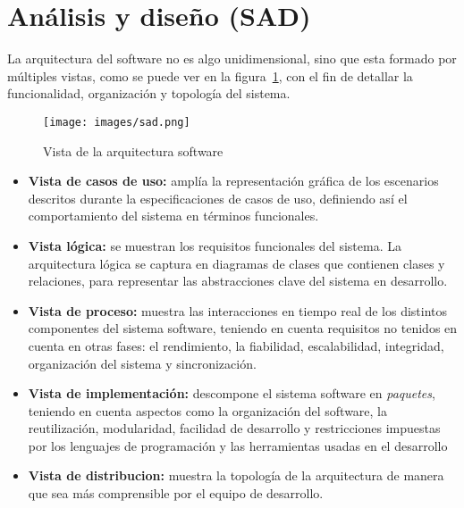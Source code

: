 
\section{Análisis y diseño (SAD)}

La arquitectura del software no es algo unidimensional, sino que esta formado 
por múltiples vistas, como se puede ver en la figura~\ref{fig:sad}, con el 
fin de detallar la funcionalidad, organización y topología del sistema.

\begin{figure}[hp]
	\centering
	\texttt{[image: images/sad.png]}
	\caption{Vista de la arquitectura software}
	\label{fig:sad}
\end{figure}

\begin{itemize}
  \item \textbf{Vista de casos de uso:} amplía la representación gráfica 
	de los escenarios descritos durante la especificaciones de casos 
	de uso, definiendo así el comportamiento del sistema en términos 
	funcionales.
  \item \textbf{Vista lógica:} se muestran los requisitos funcionales 
	del sistema. La arquitectura lógica se captura en diagramas de clases 
	que contienen clases y relaciones, para representar las abstracciones 
	clave del sistema en desarrollo.
  \item \textbf{Vista de proceso:} muestra las interacciones en tiempo real de
	los distintos componentes del sistema software, teniendo en cuenta
	requisitos no tenidos en cuenta en otras fases: el rendimiento, la 
	fiabilidad, escalabilidad, integridad, organización del sistema y 
	sincronización. 
  \item \textbf{Vista de implementación:} descompone el sistema software en
	\emph{paquetes}, teniendo en cuenta aspectos como la organización del 
	software, la reutilización, modularidad, facilidad de desarrollo y 
	restricciones impuestas por los lenguajes de programación y las 
	herramientas usadas en el desarrollo
  \item \textbf{Vista de distribucion:} muestra la topología de la arquitectura
	de manera que sea más comprensible por el equipo de desarrollo.
\end{itemize}

\newpage



\newpage



\newpage



\newpage



\newpage




